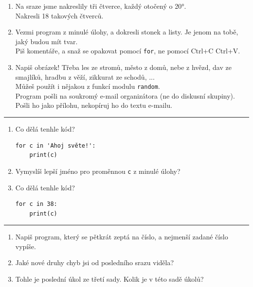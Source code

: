 \documentclass[a4paper,10pt]{article}
\begin{document}
\begin{enumerate}[resume]
\item Na sraze jsme nakreslily tři čtverce, každý otočený o 20°.
    \\Nakresli 18 takových čtverců.

\item Vezmi program z minulé úlohy, a dokresli stonek a listy.
    Je jenom na tobě, jaký budou mít tvar.
    \\Piš komentáře, a snaž se opakovat pomocí \verb+for+,
        ne pomocí Ctrl+C Ctrl+V.

\item Napiš obrázek! Třeba les ze stromů, město z domů, nebe z hvězd,
        dav ze smajlíků, hradbu z věží, zikkurat ze schodů, ...
    \\Můžeš použít i nějakou z funkcí modulu \verb+random+.
    \\Program pošli na soukromý e-mail organizátora (ne do diskusní skupiny).
    Pošli ho jako přílohu, nekopíruj ho do textu e-mailu.

\end{enumerate}

\hrule

\begin{enumerate}[resume]
\item Co dělá tenhle kód?
\begin{verbatim}
for c in 'Ahoj světe!':
    print(c)
\end{verbatim}

\item Vymyslíš lepší jméno pro proměnnou \verb+c+ z minulé úlohy?

\item Co dělá tenhle kód?
\begin{verbatim}
for c in 38:
    print(c)
\end{verbatim}

\end{enumerate}

\hrule

\begin{enumerate}[resume]
\item Napiš program, který se pětkrát zeptá na číslo, a nejmenší zadané číslo vypíše.

\item Jaké nové druhy chyb jsi od posledního srazu viděla?

\item Tohle je poslední úkol ze třetí sady. Kolik je v této sadě úkolů?

\end{enumerate}
\end{document}
